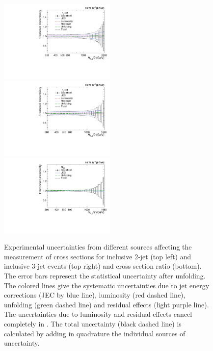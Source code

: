 \begin{figure}[!htbp]
 \begin{center}
 \hspace*{-3mm}\includegraphics[width=0.51\textwidth]{Plots_HT_2_150/Total_unc_all_2_NLO_add.pdf}%
 ~~\includegraphics[width=0.51\textwidth]{Plots_HT_2_150/Total_unc_all_3_NLO_add.pdf}\\
 \includegraphics[width=0.51\textwidth]{Plots_HT_2_150/Total_Unc_ratio_32_direct_add.pdf}
 \caption{Experimental uncertainties from different sources affecting the measurement of cross sections for inclusive 2-jet (top left) and inclusive 3-jet events (top right) and cross section ratio \ratio (bottom). The error bars represent the statistical uncertainty after unfolding. The colored lines give the systematic uncertainties due to jet energy corrections (JEC by blue line), luminosity (red dashed line), unfolding (green dashed line) and residual effects (light purple line). The uncertainties due to luminosity and residual effects cancel completely in \ratio. The total uncertainty (black dashed line) is calculated by adding in quadrature the individual sources of uncertainty.}
 \label{fig:exp_unc}
 \end{center}
\end{figure}

